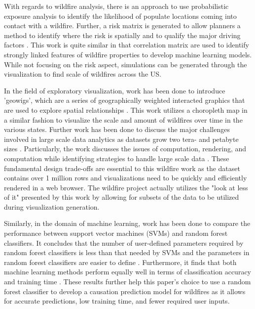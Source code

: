 \documentclass[conference]{IEEEtran}
\begin{document}
With regards to wildfire analysis, there is an approach to use probabilistic exposure analysis to identify the likelihood of populate locations coming into contact with a wildfire. Further, a risk matrix is generated to allow planners a method to identify where the risk is spatially and to qualify the major driving factors \cite{HAAS201344}. This work is quite similar in that correlation matrix are used to identify strongly linked features of wildfire properties to develop machine learning models. While not focusing on the risk aspect, simulations can be generated through the visualization to find scale of wildfires across the US. \par

In the field of exploratory visualization, work has been done to introduce 'geowigs', which are a series of geographically weighted interacted graphics that are used to explore spatial relationships \cite{4376135}. This work utilizes a choropleth map in a similar fashion to visualize the scale and amount of wildfires over time in the various states. Further work has been done to discuss the major challenges involved in large scale data analytics as datasets grow two tera- and petabyte sizes \cite{Fisher:2016:BDE:2939502.2939518}. Particularly, the work discusses the issues of computation, rendering, and computation while identifying strategies to handle large scale data \cite{Fisher:2016:BDE:2939502.2939518}. These fundamental design trade-offs are essential to this wildfire work as the dataset contains over 1 million rows and visualizations need to be quickly and efficiently rendered in a web browser. The wildfire project actually utilizes the "look at less of it" presented by this work by allowing for subsets of the data to be utilized during visualization generation. \par

Similarly, in the domain of machine learning, work has been done to compare the performance between support vector machines (SVMs) and random forest classifiers. It concludes that the number of user-defined parameters required by random forest classifiers is less than that needed by SVMs and the parameters in random forest classifiers are easier to define \cite{random_forest_related}. Furthermore, it finds that both machine learning methods perform equally well in terms of classification accuracy and training time \cite{random_forest_related}. These results further help this paper's choice to use a random forest classifier to develop a causation prediction model for wildfires as it allows for accurate predictions, low training time, and fewer required user inputs. \par
\end{document}
